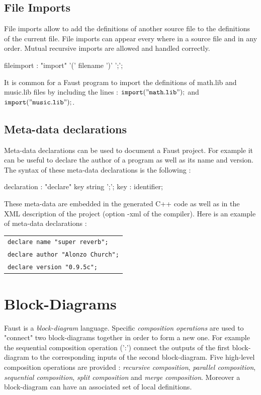 \documentclass{article}
\begin{document}
\subsection{File Imports}

File imports allow to add the definitions of another source file to the definitions of the current file. File imports can appear every where in a source file and in any order. Mutual recursive imports are allowed and handled correctly.

\begin{rail}
fileimport : "import" '(' filename ')' ';';
\end{rail}

It is common for a Faust program to import the definitions of math.lib and music.lib files by including the lines : $\mathtt{import("math.lib");}$ and  $\mathtt{import("music.lib");}$.


\subsection{Meta-data declarations}

Meta-data declarations can be used to document a Faust project. For example it can be useful to declare the author of a program as well as its name and version. The syntax of these meta-data declarations is the following :

\begin{rail}
declaration : "declare" key string ';';
key : identifier;
\end{rail}

These meta-data are embedded in the generated C++ code as well as in the XML description of the project (option -xml of the compiler). Here is an example of meta-data declarations :

\begin{tabular}{l}
	\texttt{declare name "super reverb";}\\
	\texttt{declare author "Alonzo Church";}\\
	\texttt{declare version "0.9.5c";}\\
\end{tabular}

\section{Block-Diagrams}

Faust is a \emph{block-diagram} language. Specific \emph{composition operations} are used to "connect" two block-diagrams together in order to form a new one.  For example the sequential composition operation (':') connect the outputs of the first block-diagram to the corresponding inputs of the second block-diagram. Five high-level composition operations are provided : \emph{recursive composition}, \emph{parallel composition}, \emph{sequential composition}, \emph{split composition} and \emph{merge composition}. Moreover a block-diagram can have an associated set of local definitions.
\end{document}
